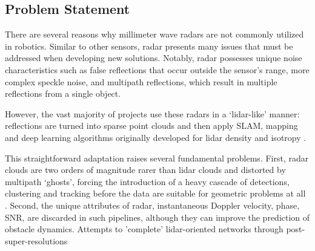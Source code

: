 




\subsection{Problem Statement}

There are several reasons why millimeter wave radars are not commonly utilized in robotics. Similar to other sensors, radar presents many issues that must be addressed when developing new solutions. Notably, radar possesses unique noise characteristics such as false reflections that occur outside the sensor's range, more complex speckle noise, and multipath reflections, which result in multiple reflections from a single object.

However, the vast majority of projects use these radars in a ‘lidar-like’ manner: reflections are turned into sparse point clouds and then apply SLAM, mapping and deep learning algorithms originally developed for lidar density and isotropy \citep{10919654}. 

This straightforward adaptation raises several fundamental problems. First, radar clouds are two orders of magnitude rarer than lidar clouds and distorted by multipath ‘ghosts’, forcing the introduction of a heavy cascade of detections, clustering and tracking before the data are suitable for geometric problems at all \citep{Wu2025DiffusionBasedMP}.
Second, the unique attributes of radar, instantaneous Doppler velocity, phase, SNR, are discarded in such pipelines, although they can improve the prediction of obstacle dynamics. Attempts to 'complete' lidar-oriented networks through post-super-resolutions\citep{10161429}


